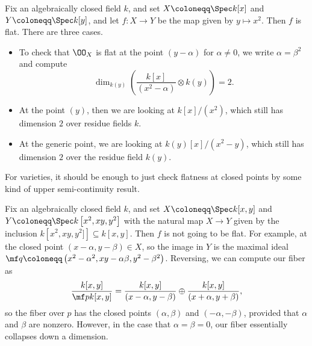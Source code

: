 \documentclass[../notes.tex]{subfiles}
\begin{document}
\begin{example}
	Fix an algebraically closed field $k$, and set $X\coloneqq\Spec k[x]$ and $Y\coloneqq\Spec k[y]$, and let $f\colon X\to Y$ be the map given by $y\mapsto x^2$. Then $f$ is flat. There are three cases.
	\begin{itemize}
		\item To check that $\OO_X$ is flat at the point $(y-\alpha)$ for $\alpha\ne0$, we write $\alpha=\beta^2$ and compute
		\[\dim_{k(y)}\left(\frac{k[x]}{\left(x^2-\alpha\right)}\otimes k(y)\right)=2.\]
		\item At the point $(y)$, then we are looking at $k[x]/\left(x^2\right)$, which still has dimension $2$ over residue fields $k$.
		\item At the generic point, we are looking at $k(y)[x]/\left(x^2-y\right)$, which still has dimension $2$ over the residue field $k(y)$.
	\end{itemize}
\end{example}
\begin{remark}
	For varieties, it should be enough to just check flatness at closed points by some kind of upper semi-continuity result.
\end{remark}
\begin{example}
	Fix an algebraically closed field $k$, and set $X\coloneqq\Spec k[x,y]$ and $Y\coloneqq\Spec k\left[x^2,xy,y^2\right]$ with the natural map $X\to Y$ given by the inclusion $k\left[x^2,xy,y^2]\right]\subseteq k[x,y]$. Then $f$ is not going to be flat. For example, at the closed point $\left(x-\alpha,y-\beta\right)\in X$, so the image in $Y$ is the maximal ideal $\mf q\coloneqq\left(x^2-\alpha^2,xy-\alpha\beta,y^2-\beta^2\right)$. Reversing, we can compute our fiber as
	\[\frac{k[x,y]}{\mf pk[x,y]}=\frac{k[x,y]}{(x-\alpha,y-\beta)}\oplus\frac{k[x,y]}{(x+\alpha,y+\beta)},\]
	so the fiber over $p$ has the closed points $(\alpha,\beta)$ and $(-\alpha,-\beta)$, provided that $\alpha$ and $\beta$ are nonzero. However, in the case that $\alpha=\beta=0$, our fiber essentially collapses down a dimension.
\end{example}
\end{document}
